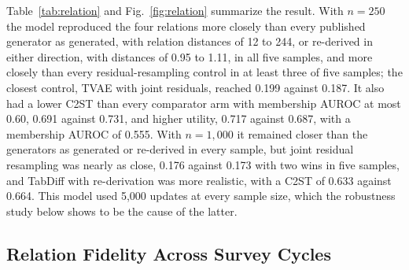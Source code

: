 \documentclass[conference]{IEEEtran}
\begin{document}
Table~\ref{tab:relation} and Fig.~\ref{fig:relation} summarize the result. With $n = 250$ the model reproduced the four relations more closely than every published generator as generated, with relation distances of 12 to 244, or re-derived in either direction, with distances of 0.95 to 1.11, in all five samples, and more closely than every residual-resampling control in at least three of five samples; the closest control, TVAE with joint residuals, reached 0.199 against 0.187. It also had a lower C2ST than every comparator arm with membership AUROC at most 0.60, 0.691 against 0.731, and higher utility, 0.717 against 0.687, with a membership AUROC of 0.555. With $n = 1{,}000$ it remained closer than the generators as generated or re-derived in every sample, but joint residual resampling was nearly as close, 0.176 against 0.173 with two wins in five samples, and TabDiff with re-derivation was more realistic, with a C2ST of 0.633 against 0.664. This model used 5,000 updates at every sample size, which the robustness study below shows to be the cause of the latter.

\subsection{Relation Fidelity Across Survey Cycles}
\end{document}
